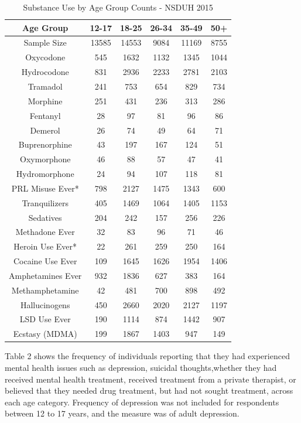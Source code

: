 \documentclass[sigconf]{acmart}
\begin{document}
\begin{table}
  \caption{Substance Use by Age Group Counts - NSDUH 2015
  \cite{samhsa16}}
  \label{tab:freq}
  \begin{tabular}{cccccc}
    \toprule
    Age Group & 12-17& 18-25& 26-34& 35-49& 50+\\
    \midrule
    Sample Size & 13585& 14553& 9084& 11169& 8755 \\
    \midrule
    Oxycodone& 545& 1632& 1132& 1345& 1044 \\
    Hydrocodone& 831& 2936& 2233& 2781& 2103 \\
    Tramadol& 241& 753& 654& 829& 734 \\
    Morphine& 251& 431& 236& 313& 286 \\
    Fentanyl& 28& 97& 81& 96& 86 \\
    Demerol& 26& 74& 49& 64& 71 \\
    Buprenorphine& 43& 197& 167& 124& 51 \\
    Oxymorphone& 46& 88& 57& 47& 41 \\
    Hydromorphone& 24& 94& 107& 118& 81 \\
    \midrule
    PRL Misuse Ever*& 798& 2127& 1475& 1343& 600 \\
    \midrule
    Tranquilizers& 405& 1469& 1064& 1405& 1153 \\
    Sedatives& 204& 242& 157& 256& 226 \\
    Methadone Ever& 32& 83& 96& 71& 46 \\
    \midrule
    Heroin Use Ever*& 22& 261& 259& 250& 164 \\
    \midrule
    Cocaine Use Ever& 109& 1645& 1626& 1954& 1406 \\
    Amphetamines Ever& 932& 1836& 627& 383& 164 \\
    Methamphetamine& 42& 481& 700&  898& 492 \\
    Hallucinogens& 450& 2660& 2020& 2127& 1197 \\
    LSD Use Ever& 190& 1114& 874& 1442& 907 \\
    Ecstasy (MDMA)& 199& 1867& 1403& 947& 149 \\
    \bottomrule
  \end{tabular}
\end{table}

Table 2 shows the frequency of individuals reporting that they had experienced
mental health issues such as depression, suicidal thoughts,whether they had 
received mental health treatment, received treatment from a private therapist, 
or believed that they needed drug treatment, but had not sought treatment, 
across each age category. Frequency of depression was not included for 
respondents between 12 to 17 years, and the measure was of adult depression. 
\end{document}
